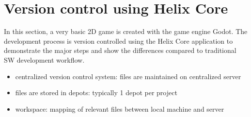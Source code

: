 \section{Version control using Helix Core\textsuperscript{\texttrademark}} \label{case-study-1}
In this section, a very basic 2D game is created with the game engine Godot. The development process is version 
controlled using the Helix Core application to demonstrate the major steps and show the differences compared to 
traditional SW development workflow.
\begin{itemize}
    \item centralized version control system: files are maintained on centralized server
    \item files are stored in depots: typically 1 depot per project
    \item workspace: mapping of relevant files between local machine and server
\end{itemize}

